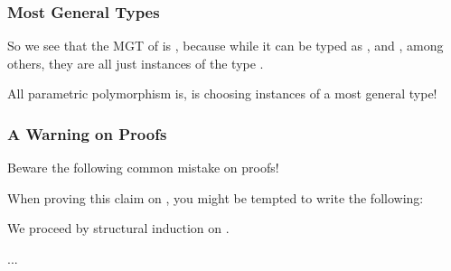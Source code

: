 \documentclass[aspectratio=169]{beamer}
\begin{document}
\begin{frame}[fragile]
  \frametitle{Most General Types}

  So we see that the MGT of  is ,
  because while it can be typed as , and
  , among others, they are all just instances
  of the type .

  \pause
  \vspace{\fill}

  All parametric polymorphism is, is choosing instances of a most general
  type!

  \pause
  \vspace{\fill}

\end{frame}

\begin{frame}[fragile]
  \frametitle{A Warning on Proofs}

  Beware the following common mistake on proofs!

  \pause
  \vspace{\fill}


  \pause
  \vspace{\fill}

  When proving this claim on , you might be tempted to
  write the following:

  \pause
  \vspace{\fill}

  We proceed by structural induction on .

  \vspace{\fill}


  \vspace{\fill}

  ...
\end{frame}
\end{document}
